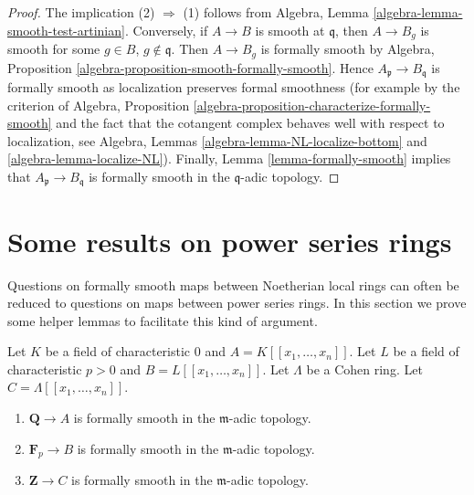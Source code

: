 \begin{proof}
The implication (2) $\Rightarrow$ (1) follows from
Algebra, Lemma \ref{algebra-lemma-smooth-test-artinian}.
Conversely, if $A \to B$ is smooth at $\mathfrak q$, then
$A \to B_g$ is smooth for some $g \in B$, $g \not \in \mathfrak q$.
Then $A \to B_g$ is formally smooth by
Algebra, Proposition \ref{algebra-proposition-smooth-formally-smooth}.
Hence $A_\mathfrak p \to B_\mathfrak q$ is formally smooth
as localization preserves formal smoothness (for example by
the criterion of Algebra, Proposition
\ref{algebra-proposition-characterize-formally-smooth}
and the fact that the cotangent complex behaves well with respect to
localization, see
Algebra, Lemmas \ref{algebra-lemma-NL-localize-bottom} and
\ref{algebra-lemma-localize-NL}).
Finally, Lemma \ref{lemma-formally-smooth} implies that
$A_\mathfrak p \to B_\mathfrak q$ is formally smooth in the
$\mathfrak q$-adic topology.
\end{proof}









\section{Some results on power series rings}
\label{section-power-series}

\noindent
Questions on formally smooth maps between Noetherian local rings
can often be reduced to questions on maps between power series
rings. In this section we prove some helper lemmas to facilitate
this kind of argument.

\begin{lemma}
\label{lemma-power-series-ring-over-Cohen-fs}
Let $K$ be a field of characteristic $0$ and $A = K[[x_1, \ldots, x_n]]$.
Let $L$ be a field of characteristic $p > 0$ and $B = L[[x_1, \ldots, x_n]]$.
Let $\Lambda$ be a Cohen ring. Let $C = \Lambda[[x_1, \ldots, x_n]]$.
\begin{enumerate}
\item $\mathbf{Q} \to A$ is formally smooth in the 
$\mathfrak m$-adic topology.
\item $\mathbf{F}_p \to B$ is formally smooth in the 
$\mathfrak m$-adic topology.
\item $\mathbf{Z} \to C$ is formally smooth in the
$\mathfrak m$-adic topology.
\end{enumerate}
\end{lemma}

